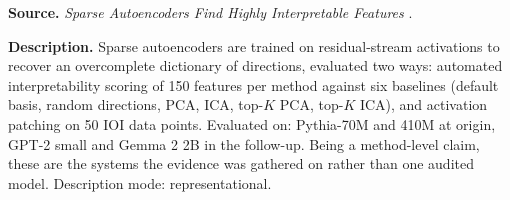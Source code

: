 
\textbf{Source.} \emph{Sparse Autoencoders Find Highly Interpretable Features} \citep{cunningham2024sparse}.

\textbf{Description.} Sparse autoencoders are trained on residual-stream activations to recover an overcomplete dictionary of directions, evaluated two ways: automated interpretability scoring of 150 features per method against six baselines (default basis, random directions, PCA, ICA, top-$K$ PCA, top-$K$ ICA), and activation patching on 50 IOI data points. Evaluated on: Pythia-70M and 410M at origin, GPT-2 small and Gemma 2 2B in the follow-up. Being a method-level claim, these are the systems the evidence was gathered on rather than one audited model. Description mode: representational.

